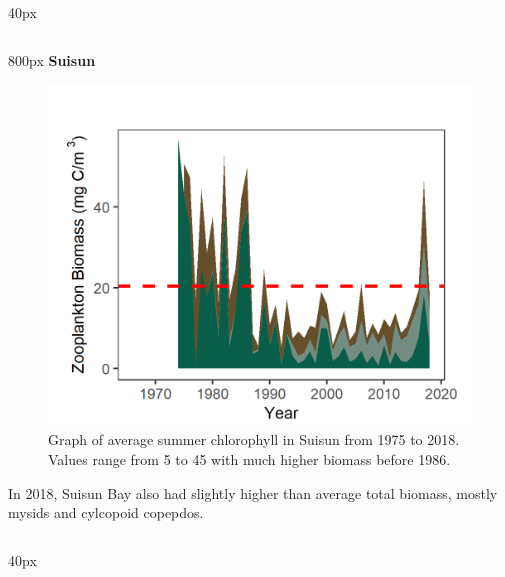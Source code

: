\documentclass[
]{book}
\begin{document}
\begin{column}{40px\textwidth}
~
\end{column}

\begin{column}{800px\textwidth}
\textbf{Suisun}

\begin{figure}
\includegraphics[width=15.25in]{figures/zoops_sssummer} \caption{Graph of average summer chlorophyll in Suisun from 1975 to 2018. Values range from 5 to 45 with much higher biomass before 1986.}\label{fig:unnamed-chunk-71}
\end{figure}

In 2018, Suisun Bay also had slightly higher than average total biomass, mostly mysids and cylcopoid copepdos.
\end{column}

\begin{column}{40px\textwidth}
~
\end{column}
\end{document}

